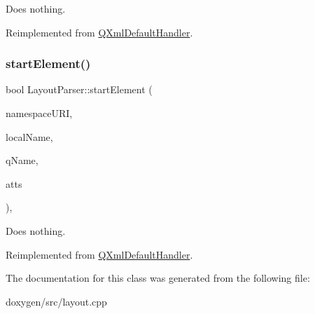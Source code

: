 Does nothing. 

Reimplemented from \mbox{\hyperlink{class_q_xml_default_handler_a5a1135641cb81d4053ecd4783c7c252b}{Q\+Xml\+Default\+Handler}}.

\mbox{\label{class_layout_parser_aa870786ef488ce9d300214dab2c497ae}} 
\subsubsection{\texorpdfstring{startElement()}{startElement()}}
{\footnotesize\ttfamily bool Layout\+Parser\+::start\+Element (\begin{DoxyParamCaption}\item[{const \mbox{\hyperlink{class_q_string}{Q\+String}} \&}]{namespace\+U\+RI,  }\item[{const \mbox{\hyperlink{class_q_string}{Q\+String}} \&}]{local\+Name,  }\item[{const \mbox{\hyperlink{class_q_string}{Q\+String}} \&}]{q\+Name,  }\item[{const \mbox{\hyperlink{class_q_xml_attributes}{Q\+Xml\+Attributes}} \&}]{atts }\end{DoxyParamCaption})\hspace{0.3cm}{\ttfamily [inline]}, {\ttfamily [virtual]}}

Does nothing. 

Reimplemented from \mbox{\hyperlink{class_q_xml_default_handler_a0381a337b32a16d2ef2a8df9a29cb215}{Q\+Xml\+Default\+Handler}}.



The documentation for this class was generated from the following file\+:\begin{DoxyCompactItemize}
\item 
doxygen/src/layout.\+cpp\end{DoxyCompactItemize}
